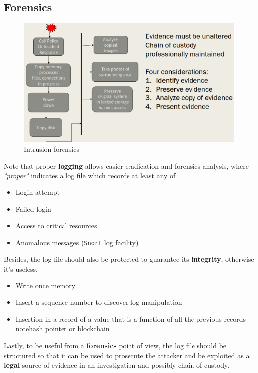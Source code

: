 \subsection{Forensics}
\begin{figure}[htbp]
   \centering
   \includegraphics{images/intrusion_forensics.png}
   \caption{Intrusion forensics}
   \label{fig:intrusion_forensics}
\end{figure}

Note that proper \textbf{logging} allows easier eradication and forensics analysis,
where \textit{"proper"} indicates a log file which records at least any of
\begin{itemize}
   \item Login attempt
   \item Failed login
   \item Access to critical resources
   \item Anomalous messages (\texttt{Snort} log facility)
\end{itemize}
Besides, the log file should also be protected to guarantee its \textbf{integrity}, otherwise it's useless.
\begin{itemize}
   \item Write once memory 
   \item Insert a sequence number to discover log manipulation
   \item Insertion in a record of a value that is a function of all the previous
   records 
   note{hash pointer or blockchain}
\end{itemize}

Lastly,
to be useful from a \textbf{forensics} point of view,
the log file should be structured so that it can be used to prosecute the attacker and be exploited as a \textbf{legal} source of evidence in an
investigation and possibly chain of custody.

